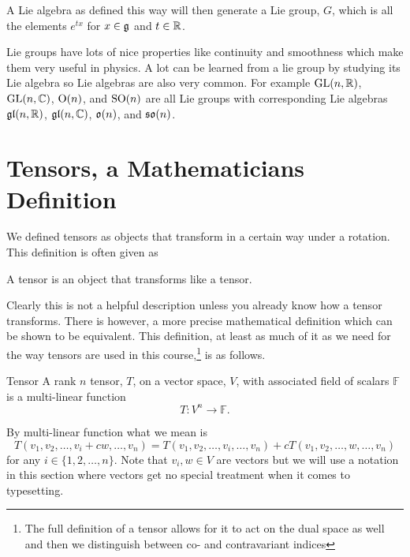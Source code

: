 A Lie algebra as defined this way will then generate a Lie group, \(G\), which is all the elements \(e^{tx}\) for \(x\in\mathfrak{g}\) and \(t\in\mathbb{R}\).

Lie groups have lots of nice properties like continuity and smoothness which make them very useful in physics.
A lot can be learned from a lie group by studying its Lie algebra so Lie algebras are also very common.
For example \(\mathrm{GL}(n, \mathbb{R})\), \(\mathrm{GL}(n, \mathbb{C})\), \(\mathrm{O}(n)\), and \(\mathrm{SO}(n)\) are all Lie groups with corresponding Lie algebras \(\mathfrak{gl}(n, \mathbb{R})\), \(\mathfrak{gl}(n, \mathbb{C})\), \(\mathfrak{o}(n)\), and \(\mathfrak{so}(n)\).

\section{Tensors, a Mathematicians Definition}\label{app:tensors}
We defined tensors as objects that transform in a certain way under a rotation.
This definition is often given as
\begin{displayquote}
    A tensor is an object that transforms like a tensor.
\end{displayquote}
Clearly this is not a helpful description unless you already know how a tensor transforms.
There is however, a more precise mathematical definition which can be shown to be equivalent.
This definition, at least as much of it as we need for the way tensors are used in this course,\footnote{The full definition of a tensor allows for it to act on the dual space as well and then we distinguish between co- and contravariant indices} is as follows.
\begin{definition}{Tensor}{}
    A rank \(n\) tensor, \(T\), on a vector space, \(V\), with associated field of scalars \(\mathbb{F}\) is a multi-linear function
    \[T\colon V^n \to \mathbb{F}.\]
\end{definition}
By multi-linear function what we mean is
\[T(v_1, v_2, \dotsc, v_i + cw, \dotsc, v_n) = T(v_1, v_2, \dotsc, v_i, \dotsc, v_n) + cT(v_1, v_2, \dotsc, w, \dotsc, v_n)\]
for any \(i\in\{1, 2, \dotsc, n\}\).
Note that \(v_i, w\in V\) are vectors but we will use a notation in this section where vectors get no special treatment when it comes to typesetting.

